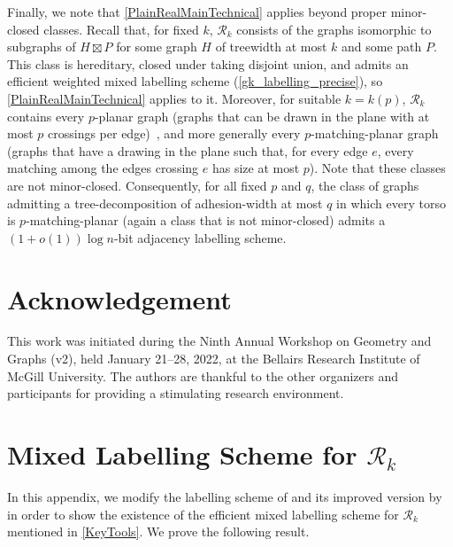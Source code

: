\documentclass{patmorin}
\newcommand{\calR}{\mathcal{R}}
\begin{document}
Finally, we note that \cref{PlainRealMainTechnical} applies beyond proper
minor-closed classes. Recall that, for fixed $k$, $\calR_k$ consists of
the graphs isomorphic to subgraphs of $H\boxtimes P$ for some graph $H$ of
treewidth at most $k$ and some path $P$. This class is hereditary, closed
under taking disjoint union, and admits an efficient weighted mixed labelling
scheme (\cref{gk_labelling_precise}), so \cref{PlainRealMainTechnical} applies
to it. Moreover, for suitable $k=k(p)$, $\calR_k$ contains every
$p$-planar graph (graphs that can be drawn in the plane with at most $p$
crossings per edge)~\citep{dujmovic.morin.ea:graph}, and more generally every
$p$-matching-planar graph~\citep{DBLP:journals/corr/abs-2507-22395} (graphs that have a drawing in the plane such that, for every edge $e$, every
matching among the edges crossing $e$ has size at most $p$). Note that these classes are not minor-closed. Consequently, for all fixed $p$ and $q$, the class of graphs admitting a tree-decomposition of adhesion-width at most $q$ in which every
torso is $p$-matching-planar (again a class that is not minor-closed)
 admits a $(1+o(1))\log n$-bit adjacency labelling scheme.


\section*{Acknowledgement} 
This work was initiated during the Ninth Annual Workshop on Geometry and Graphs (v2), held January 21--28, 2022, at the Bellairs Research Institute of McGill University.  The authors are thankful to the other organizers and participants for providing a stimulating research environment.

\setlength{\bibsep}{0.3ex plus 0.1ex minus 0.1ex}



\appendix
{}

\section{Mixed Labelling Scheme for \texorpdfstring{$\calR_k$}{Rk}}
\label{weighted_product_proof}

In this appendix, we modify the labelling scheme of \citet{dujmovic.esperet.ea:adjacency} and its improved version by \citet{gawrychowski.janczewski:simpler} in order to show the existence of the efficient mixed labelling scheme for $\calR_k$ mentioned in \cref{KeyTools}.  We prove the following result.
\end{document}

